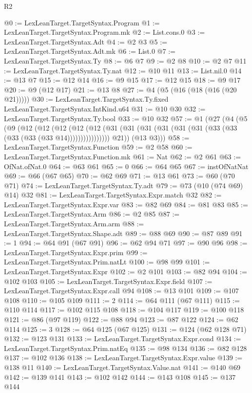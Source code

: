 \begin{lexlean}{R2}
\begin{coremodule}
@0 := LexLeanTarget.TargetSyntax.Program
@1 := LexLeanTarget.TargetSyntax.Program.mk
@2 := List.cons.{0}
@3 := LexLeanTarget.TargetSyntax.Adt
@4 := @2 @3
@5 := LexLeanTarget.TargetSyntax.Adt.mk
@6 := List.{0}
@7 := LexLeanTarget.TargetSyntax.Ty
@8 := @6 @7
@9 := @2 @8
@10 := @2 @7
@11 := LexLeanTarget.TargetSyntax.Ty.nat
@12 := @10 @11
@13 := List.nil.{0}
@14 := @13 @7
@15 := @12 @14
@16 := @9 @15
@17 := @12 @15
@18 := @9 @17
@20 := @9 (@12 @17)
@21 := @13 @8
@27 := @4 (@5 (@16 (@18 (@16 (@20 @21)))))
@30 := LexLeanTarget.TargetSyntax.Ty.fixed LexLeanTarget.TargetSyntax.IntKind.u64
@31 := @10 @30
@32 := LexLeanTarget.TargetSyntax.Ty.bool
@33 := @10 @32
@57 := @1
    (@27
      (@4
        (@5
          (@9
            (@12
              (@12
                (@12
                  (@12
                    (@12 (@31 (@31 (@31 (@31 (@31 (@31 (@33 (@33 (@33 (@33 (@33 @14))))))))))))))))
            @21))
        (@13 @3)))
@58 := LexLeanTarget.TargetSyntax.Function
@59 := @2 @58
@60 := LexLeanTarget.TargetSyntax.Function.mk
@61 := Nat
@62 := @2 @61
@63 := OfNat.ofNat.{0}
@64 := @63 @61
@65 := 0
@66 := @64 @65
@67 := instOfNatNat
@69 := @66 (@67 @65)
@70 := @62 @69
@71 := @13 @61
@73 := @60 (@70 @71)
@74 := LexLeanTarget.TargetSyntax.Ty.adt
@79 := @73 (@10 (@74 @69) @14) @32
@81 := LexLeanTarget.TargetSyntax.Expr.match @32
@82 := LexLeanTarget.TargetSyntax.Expr.var
@83 := @82 @69
@84 := @81 @83
@85 := LexLeanTarget.TargetSyntax.Arm
@86 := @2 @85
@87 := LexLeanTarget.TargetSyntax.Arm.arm
@88 := LexLeanTarget.TargetSyntax.Shape.adt
@89 := @88 @69
@90 := @87 @89
@91 := 1
@94 := @64 @91 (@67 @91)
@96 := @62 @94 @71
@97 := @90 @96
@98 := LexLeanTarget.TargetSyntax.Expr.prim
@99 := LexLeanTarget.TargetSyntax.Prim.natLt
@100 := @98 @99
@101 := LexLeanTarget.TargetSyntax.Expr
@102 := @2 @101
@103 := @82 @94
@104 := @102 @103
@105 := LexLeanTarget.TargetSyntax.Expr.field
@107 := LexLeanTarget.TargetSyntax.Expr.call @94
@108 := @13 @101
@109 := @107 @108
@110 := @105 @109
@111 := 2
@114 := @64 @111 (@67 @111)
@115 := @110 @114
@117 := @102 @115 @108
@118 := @104 @117
@119 := @100 @118
@121 := @86 (@97 @119)
@122 := @88 @94
@123 := @87 @122
@124 := @62 @114
@125 := 3
@128 := @64 @125 (@67 @125)
@131 := @124 (@62 @128 @71)
@132 := @123 @131
@133 := LexLeanTarget.TargetSyntax.Expr.cond
@134 := LexLeanTarget.TargetSyntax.Prim.natEq
@135 := @98 @134
@136 := @82 @128
@137 := @102 @136
@138 := LexLeanTarget.TargetSyntax.Expr.value
@139 := @138 @11
@140 := LexLeanTarget.TargetSyntax.Value.nat
@141 := @140 @69
@142 := @139 @141
@143 := @102 @142
@144 := @143 @108
@145 := @137 @144

\end{coremodule}
\end{lexlean}
